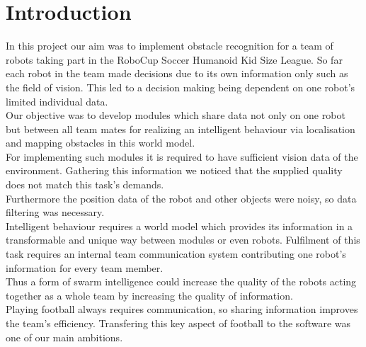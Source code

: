 \documentclass[lnicst,a4paper]{svmultln}
\begin{document}

\section{Introduction}

In this project our aim was to implement obstacle recognition for a team of robots taking part in the RoboCup Soccer Humanoid Kid Size League. So far each robot in the team made decisions due to its own information only such as the field of vision. This led to a decision making being dependent on one robot's limited individual data.
\\
Our objective was to develop modules which share data not only on one robot but between all team mates for realizing an intelligent behaviour via localisation and mapping obstacles in this world model.
\\
For implementing such modules it is required to have sufficient vision data of the environment. Gathering this information we noticed that the supplied quality does not match this task's demands.
\\
Furthermore the position data of the robot and other objects were noisy, so data filtering was necessary.
\\
Intelligent behaviour requires a world model which provides its information in a transformable and unique way between modules or even robots. Fulfilment of this task requires an internal team communication system contributing one robot's information for every team member.
\\
Thus a form of swarm intelligence could increase the quality of the robots acting together as a whole team by increasing the quality of information.
\\
Playing football always requires communication, so sharing information improves the team's efficiency. Transfering this key aspect of football to the software was one of our main ambitions.
\end{document}
